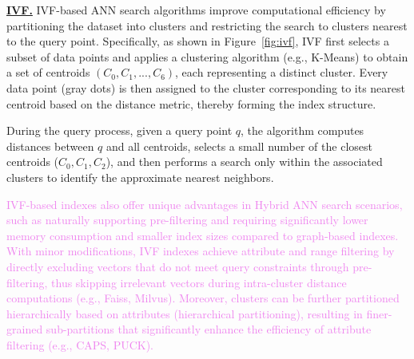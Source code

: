 \documentclass[sigconf, nonacm]{acmart}
\begin{document}
	
	\noindent\textbf{\underline{IVF.}}  IVF-based ANN search algorithms improve computational efficiency by partitioning the dataset into clusters and restricting the search to clusters nearest to the query point. Specifically, as shown in Figure~\ref{fig:ivf}, IVF first selects a subset of data points and applies a clustering algorithm (e.g., K-Means) to obtain a set of centroids $(C_0, C_1, ..., C_6)$, each representing a distinct cluster. Every data point (gray dots) is then assigned to the cluster corresponding to its nearest centroid based on the distance metric, thereby forming the index structure.
	
	During the query process, given a query point $q$, the algorithm computes distances between $q$ and all centroids, selects a small number of the closest centroids ($C_0, C_1, C_2$), and then performs a search only within the associated clusters to identify the approximate nearest neighbors.
	
	\textcolor{violet}{IVF-based indexes also offer unique advantages in Hybrid ANN search scenarios, such as naturally supporting pre-filtering and requiring significantly lower memory consumption and smaller index sizes compared to graph-based indexes. With minor modifications, IVF indexes achieve attribute and range filtering by directly excluding vectors that do not meet query constraints through pre-filtering, thus skipping irrelevant vectors during intra-cluster distance computations (e.g., Faiss, Milvus). Moreover, clusters can be further partitioned hierarchically based on attributes (hierarchical partitioning), resulting in finer-grained sub-partitions that significantly enhance the efficiency of attribute filtering (e.g., CAPS, PUCK).}
	
\end{document}
